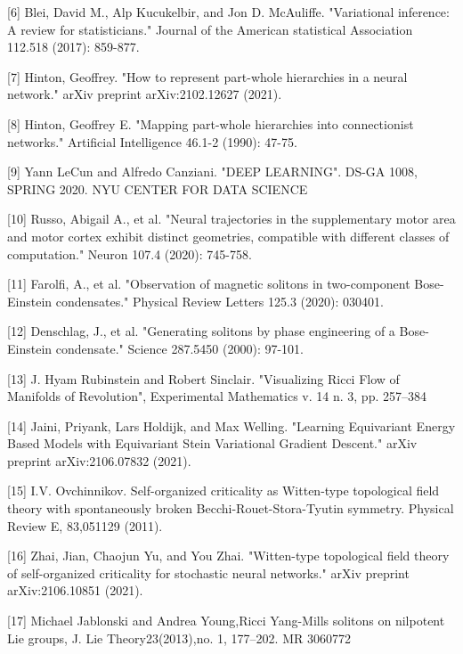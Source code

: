 \documentclass{article}
\begin{document}
[6] Blei, David M., Alp Kucukelbir, and Jon D. McAuliffe. "Variational inference: A review for statisticians." Journal of the American statistical Association 112.518 (2017): 859-877.


[7] Hinton, Geoffrey. "How to represent part-whole hierarchies in a neural network." arXiv preprint arXiv:2102.12627 (2021).

[8] Hinton, Geoffrey E. "Mapping part-whole hierarchies into connectionist networks." Artificial Intelligence 46.1-2 (1990): 47-75.

[9]  Yann LeCun  and Alfredo Canziani. "DEEP LEARNING". DS-GA 1008, SPRING 2020. NYU CENTER FOR DATA SCIENCE

[10] Russo, Abigail A., et al. "Neural trajectories in the supplementary motor area and motor cortex exhibit distinct geometries, compatible with different classes of computation." Neuron 107.4 (2020): 745-758.

[11] Farolfi, A., et al. "Observation of magnetic solitons in two-component Bose-Einstein condensates." Physical Review Letters 125.3 (2020): 030401.

[12] Denschlag, J., et al. "Generating solitons by phase engineering of a Bose-Einstein condensate." Science 287.5450 (2000): 97-101.

[13] J. Hyam Rubinstein and Robert Sinclair. "Visualizing Ricci Flow of Manifolds of Revolution", Experimental Mathematics v. 14 n. 3, pp. 257–384

[14] Jaini, Priyank, Lars Holdijk, and Max Welling. "Learning Equivariant Energy Based Models with Equivariant Stein Variational Gradient Descent." arXiv preprint arXiv:2106.07832 (2021).

[15] I.V. Ovchinnikov. Self-organized criticality as Witten-type topological field theory with spontaneously
broken Becchi-Rouet-Stora-Tyutin symmetry. Physical Review E, 83,051129 (2011).

[16] Zhai, Jian, Chaojun Yu, and You Zhai. "Witten-type topological field theory of self-organized criticality for stochastic neural networks." arXiv preprint arXiv:2106.10851 (2021).

[17] Michael Jablonski and Andrea Young,Ricci Yang-Mills solitons on nilpotent Lie groups, J. Lie Theory23(2013),no. 1, 177–202. MR 3060772



\end{document}
